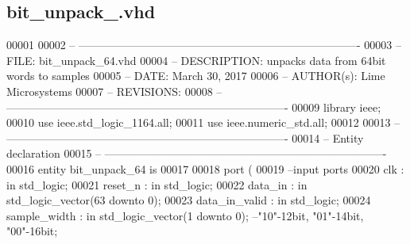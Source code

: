 \subsection{bit\+\_\+unpack\+\_.\+vhd}
\label{bit__unpack__64_8vhd_source}

\begin{DoxyCode}
00001 
00002 \textcolor{keyword}{-- ---------------------------------------------------------------------------- }
00003 \textcolor{keyword}{-- FILE:    bit\_unpack\_64.vhd}
00004 \textcolor{keyword}{-- DESCRIPTION: unpacks data from 64bit words to samples}
00005 \textcolor{keyword}{-- DATE:    March 30, 2017}
00006 \textcolor{keyword}{-- AUTHOR(s):   Lime Microsystems}
00007 \textcolor{keyword}{-- REVISIONS:}
00008 \textcolor{keyword}{-- ---------------------------------------------------------------------------- }
00009 \textcolor{vhdlkeyword}{library }\textcolor{keywordflow}{ieee};
00010 \textcolor{vhdlkeyword}{use }ieee.std\_logic\_1164.\textcolor{keywordflow}{all};
00011 \textcolor{vhdlkeyword}{use }ieee.numeric\_std.\textcolor{keywordflow}{all};
00012 
00013 \textcolor{keyword}{-- ----------------------------------------------------------------------------}
00014 \textcolor{keyword}{-- Entity declaration}
00015 \textcolor{keyword}{-- ----------------------------------------------------------------------------}
00016 \textcolor{keywordflow}{entity }bit_unpack_64 \textcolor{keywordflow}{is}
00017 
00018   \textcolor{keywordflow}{port} \textcolor{vhdlchar}{(}
00019 \textcolor{keyword}{        --input ports }
00020         \textcolor{vhdlchar}{clk}             \textcolor{vhdlchar}{:} \textcolor{keywordflow}{in} \textcolor{comment}{std\_logic};
00021         \textcolor{vhdlchar}{reset_n}         \textcolor{vhdlchar}{:} \textcolor{keywordflow}{in} \textcolor{comment}{std\_logic};
00022         \textcolor{vhdlchar}{data_in}         \textcolor{vhdlchar}{:} \textcolor{keywordflow}{in} \textcolor{comment}{std\_logic\_vector}\textcolor{vhdlchar}{(}\textcolor{vhdllogic}{}\textcolor{vhdllogic}{63} \textcolor{keywordflow}{downto} \textcolor{vhdllogic}{}\textcolor{vhdllogic}{0}\textcolor{vhdlchar}{)};
00023         \textcolor{vhdlchar}{data_in_valid}   \textcolor{vhdlchar}{:} \textcolor{keywordflow}{in} \textcolor{comment}{std\_logic};
00024         \textcolor{vhdlchar}{sample_width}    \textcolor{vhdlchar}{:} \textcolor{keywordflow}{in} \textcolor{comment}{std\_logic\_vector}\textcolor{vhdlchar}{(}\textcolor{vhdllogic}{}\textcolor{vhdllogic}{1} \textcolor{keywordflow}{downto} \textcolor{vhdllogic}{}\textcolor{vhdllogic}{0}\textcolor{vhdlchar}{)};\textcolor{keyword}{ --"10"-12bit, "01"-14bit, "00"-16bit;}

\end{DoxyCode}

